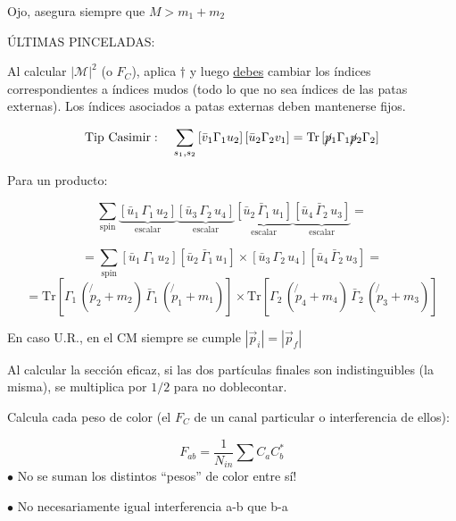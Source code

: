 Ojo, asegura siempre que $M > m_1 + m_2$


\clearpage


    
ÚLTIMAS PINCELADAS: 

Al calcular $|\mathcal{M}|^2$ (o $F_C$), aplica $\dagger$ y luego \underline{debes} cambiar los índices correspondientes a índices mudos (todo lo que no sea índices de las patas externas). Los índices asociados a patas externas deben mantenerse fijos.

$$\text{Tip Casimir}: \quad  \sum_{s_1, s_2} \left[ \bar{v}_1 \Gamma_1 u_2 \right] \left[ \bar{u}_2 \Gamma_2 v_1 \right] = \text{Tr} \left[ \cancel{p}_1 \Gamma_1 \cancel{p}_2  \Gamma_2 \right]$$


Para un producto: 

$$\sum_{\text{spin}}
\underbrace{[\bar{u}_1 \,\Gamma_1\, u_2]}_{\text{escalar}}
\underbrace{[\bar{u}_3 \,\Gamma_2\, u_4]}_{\text{escalar}}
\underbrace{[\bar{u}_2 \,\bar{\Gamma}_1\, u_1]}_{\text{escalar}}
\underbrace{[\bar{u}_4 \,\bar{\Gamma}_2\, u_3]}_{\text{escalar}} =$$


$$ = \sum_{\text{spin}}
[\bar{u}_1 \,\Gamma_1\, u_2][\bar{u}_2 \,\bar{\Gamma}_1\, u_1]
\times
[\bar{u}_3 \,\Gamma_2\, u_4][\bar{u}_4 \,\bar{\Gamma}_2\, u_3]=$$
$$ =\text{Tr}\!\left[\Gamma_1\,(\not{p}_2 + m_2)\,\bar{\Gamma}_1\,(\not{p}_1 + m_1)\right]
\times
\text{Tr}\!\left[\Gamma_2\,(\not{p}_4 + m_4)\,\bar{\Gamma}_2\,(\not{p}_3 + m_3)\right]$$






\vspace{2pt}
En caso U.R., en el CM siempre se cumple $|\vec{p}_i| = |\vec{p}_f|$


\vspace{2pt}

Al calcular la sección eficaz, si las dos partículas finales son indistinguibles (la misma), se multiplica por $1/2$ para no doblecontar.

\vspace{2pt}


Calcula cada peso de color (el $F_C$ de un canal particular o interferencia de ellos): 

$$F_{ab} = \frac{1}{N_{in}} \sum C_a C_b^{*}$$
$\bullet$ No se suman los distintos ``pesos'' de color entre sí! 

$\bullet$ No necesariamente igual interferencia a-b que b-a

